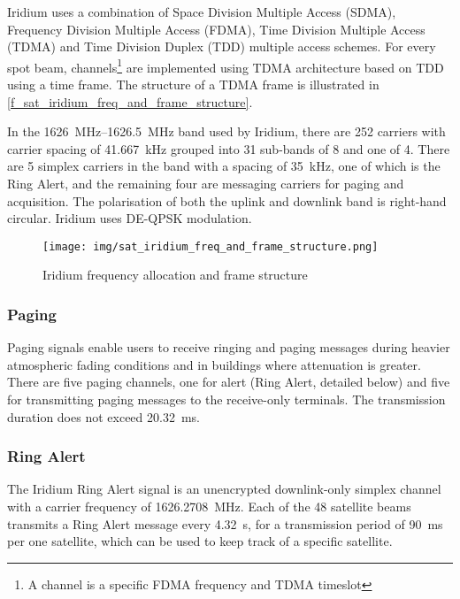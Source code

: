 Iridium uses a combination of Space Division Multiple Access (SDMA),  Frequency Division Multiple Access (FDMA), Time Division Multiple Access (TDMA) and Time Division Duplex (TDD) multiple access schemes\cite{sop11}. For every spot beam, channels\footnote{A channel is a specific FDMA frequency and TDMA timeslot\cite{sat07}} are implemented using TDMA architecture based on TDD using a time frame\cite{sop12}. The structure of a TDMA frame is illustrated in \autoref{f_sat_iridium_freq_and_frame_structure}.

In the \qtyrange{1626}{1626.5}{\MHz} band used by Iridium, there are 252 carriers with carrier spacing of \qty{41.667}{\kHz} grouped into 31 sub-bands of 8 and one of 4. There are 5 simplex carriers in the band with a spacing of \qty{35}{\kHz}, one of which is the Ring Alert, and the remaining four are messaging carriers for paging and acquisition. The polarisation of both the uplink and downlink band is right-hand circular. Iridium uses DE-QPSK modulation\cite{sat04}.

\begin{figure}
    \centering
    \texttt{[image: img/sat\_iridium\_freq\_and\_frame\_structure.png]}
    \caption{Iridium frequency allocation and frame structure\cite{sop12}}
    \label{f_sat_iridium_freq_and_frame_structure}
\end{figure}

\subsubsection{Paging}
Paging signals enable users to receive ringing and paging messages during heavier atmospheric fading conditions and in buildings where attenuation is greater. There are five paging channels, one for alert (Ring Alert, detailed below) and five for transmitting paging messages to the receive-only terminals.  The transmission duration does not exceed \qty{20.32}{\ms}\cite{sat09}.

\subsubsection{Ring Alert}
The Iridium Ring Alert signal is an unencrypted downlink-only simplex channel with a carrier frequency of \qty{1626.2708}{\MHz}\cite{sat04}. Each of the 48 satellite beams transmits a Ring Alert message every \qty{4.32}{\s}, for a transmission period of \qty{90}{\ms} per one satellite\cite{sat07}, which can be used to keep track of a specific satellite\cite{sop11}.


